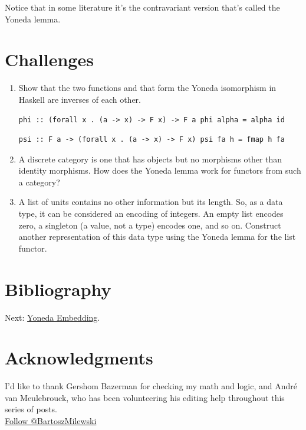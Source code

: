 Notice that in some literature it's the contravariant version that's
called the Yoneda lemma.

\section{Challenges}\label{challenges}

\begin{enumerate}
\item
  Show that the two functions  and  that form
  the Yoneda isomorphism in Haskell are inverses of each other.

\begin{Verbatim}[commandchars=\\\{\}]
phi :: (forall x . (a -> x) -> F x) -> F a phi alpha = alpha id
\end{Verbatim}

\begin{Verbatim}[commandchars=\\\{\}]
psi :: F a -> (forall x . (a -> x) -> F x) psi fa h = fmap h fa
\end{Verbatim}
\item
  A discrete category is one that has objects but no morphisms other
  than identity morphisms. How does the Yoneda lemma work for functors
  from such a category?
\item
  A list of units \code{{[}(){]}} contains no other information but
  its length. So, as a data type, it can be considered an encoding of
  integers. An empty list encodes zero, a singleton \code{{[}(){]}} (a
  value, not a type) encodes one, and so on. Construct another
  representation of this data type using the Yoneda lemma for the list
  functor.
\end{enumerate}

\section{Bibliography}\label{bibliography}

Next:
\href{https://bartoszmilewski.com/2015/10/28/yoneda-embedding/}{Yoneda
Embedding}.

\section{Acknowledgments}\label{acknowledgments}

I'd like to thank Gershom Bazerman for checking my math and logic, and
André van Meulebrouck, who has been volunteering his editing help
throughout this series of posts.\\
\href{https://twitter.com/BartoszMilewski}{Follow @BartoszMilewski}

